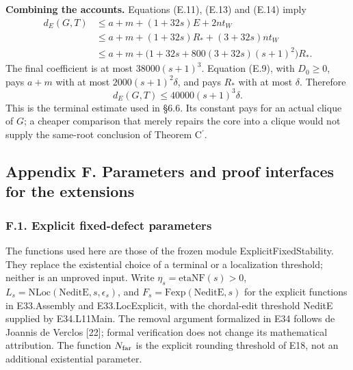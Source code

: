 \documentclass[english,11pt,a4paper]{article}
\begin{document}
\textbf{Combining the accounts.} Equations (E.11), (E.13) and (E.14) imply \[
\begin{aligned}
d_E(G,T)&\le a+m+(1+32s)E+2nt_W\\
&\le a+m+(1+32s)R_*+(3+32s)nt_W\\
&\le a+m+\bigl(1+32s+800(3+32s)(s+1)^2\bigr)R_*.
\end{aligned}
\] The final coefficient is at most \(38000(s+1)^3\). Equation (E.9), with \(D_0\ge0\), pays \(a+m\) with at most \(2000(s+1)^2\delta\), and pays \(R_*\) with at most \(\delta\). Therefore \[
d_E(G,T)\le40000(s+1)^3\delta.
\] This is the terminal estimate used in §6.6. Its constant pays for an actual clique of \(G\); a cheaper comparison that merely repairs the core into a clique would not supply the same-root conclusion of Theorem \texorpdfstring{C\ensuremath{^{\prime}}}{C'}.

\subsection{Appendix F. Parameters and proof interfaces for the extensions}\label{appendix-f.-parameters-and-proof-interfaces-for-the-extensions}

\subsubsection{F.1. Explicit fixed-defect parameters}\label{f.1.-explicit-fixed-defect-parameters}

The functions used here are those of the frozen module {\ttfamily\small ExplicitFixe\discretionary{\hbox{\ensuremath{\hookrightarrow}}}{}{}dStability}. They replace the existential choice of a terminal or a localization threshold; neither is an unproved input. Write \(\eta_s=\mathrm{etaNF}(s)>0\), \(L_s=\mathrm{NLoc}(\mathrm{NeditE},s,\epsilon_s)\), and \(F_s=\mathrm{Fexp}(\mathrm{NeditE},s)\) for the explicit functions in {\ttfamily\small E33.\discretionary{\hbox{\ensuremath{\hookrightarrow}}}{}{}Assembly} and {\ttfamily\small E33.\discretionary{\hbox{\ensuremath{\hookrightarrow}}}{}{}LocExplicit}, with the chordal-edit threshold NeditE supplied by {\ttfamily\small E34.\discretionary{\hbox{\ensuremath{\hookrightarrow}}}{}{}L11Main}. The removal argument formalized in E34 follows de Joannis de Verclos {[}22{]}; formal verification does not change its mathematical attribution. The function \(N_{\rm far}\) is the explicit rounding threshold of E18, not an additional existential parameter.
\end{document}
